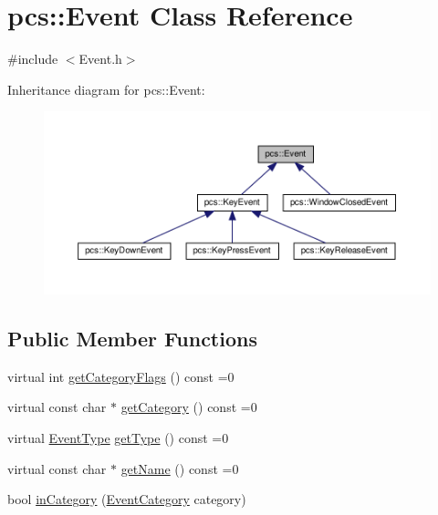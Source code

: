 \hypertarget{classpcs_1_1Event}{}\section{pcs\+:\+:Event Class Reference}
\label{classpcs_1_1Event}


{\ttfamily \#include $<$Event.\+h$>$}



Inheritance diagram for pcs\+:\+:Event\+:\nopagebreak
\begin{figure}[H]
\begin{center}
\leavevmode
\includegraphics[width=350pt]{classpcs_1_1Event__inherit__graph}
\end{center}
\end{figure}
\subsection*{Public Member Functions}
\begin{DoxyCompactItemize}
\item 
virtual int \hyperlink{classpcs_1_1Event_a1cdcf7b0410496912c19417f72caed48}{get\+Category\+Flags} () const =0
\item 
virtual const char $\ast$ \hyperlink{classpcs_1_1Event_a066245823d5a005204574bccd544d8dd}{get\+Category} () const =0
\item 
virtual \hyperlink{namespacepcs_a12954f53e3d7d6a8765fd723e1ce8db4}{Event\+Type} \hyperlink{classpcs_1_1Event_a7ea17b26f979770e7809af854efe0f57}{get\+Type} () const =0
\item 
virtual const char $\ast$ \hyperlink{classpcs_1_1Event_a08392dd589a27532532b61103af6f291}{get\+Name} () const =0
\item 
bool \hyperlink{classpcs_1_1Event_ad3d636ba00a11cab150c2fdad81acc93}{in\+Category} (\hyperlink{namespacepcs_a3538ef524602fc09ddb40acc72480c60}{Event\+Category} category)
\end{DoxyCompactItemize}
